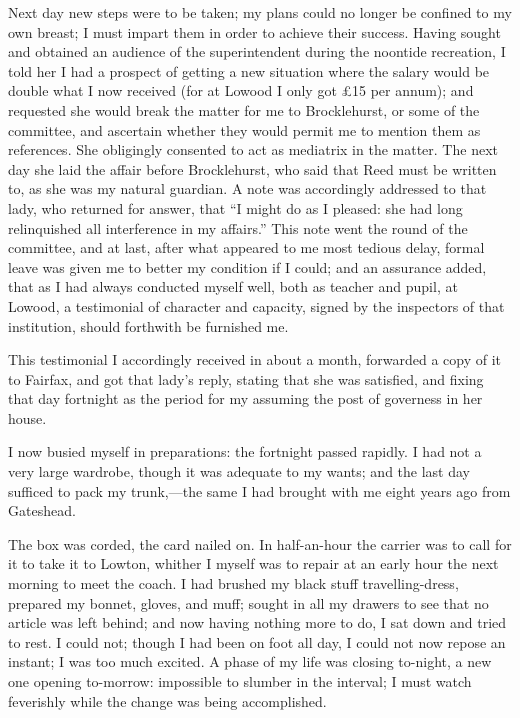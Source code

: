 Next day new steps were to be taken; my plans could no longer be
confined to my own breast; I must impart them in order to achieve their
success. Having sought and obtained an audience of the superintendent
during the noontide recreation, I told her I had a prospect of getting a
new situation where the salary would be double what I now received (for
at Lowood I only got £15 per annum); and requested she would break the
matter for me to \Mr{} Brocklehurst, or some of the committee, and
ascertain whether they would permit me to mention them as references.
She obligingly consented to act as mediatrix in the matter. The next
day she laid the affair before \Mr{} Brocklehurst, who said that \Mrs{} Reed
must be written to, as she was my natural guardian. A note was
accordingly addressed to that lady, who returned for answer, that
\enquote{I might do as I pleased: she had long relinquished all
	interference in my affairs.} This note went the round of the committee,
and at last, after what appeared to me most tedious delay, formal leave
was given me to better my condition if I could; and an assurance added,
that as I had always conducted myself well, both as teacher and pupil,
at Lowood, a testimonial of character and capacity, signed by the
inspectors of that institution, should forthwith be furnished me.

This testimonial I accordingly received in about a month, forwarded a
copy of it to \Mrs{} Fairfax, and got that lady's reply, stating that she
was satisfied, and fixing that day fortnight as the period for my
assuming the post of governess in her house.

I now busied myself in preparations: the fortnight passed rapidly. I
had not a very large wardrobe, though it was adequate to my wants; and
the last day sufficed to pack my trunk,---the same I had brought with me
eight years ago from Gateshead.

The box was corded, the card nailed on. In half-an-hour the carrier was
to call for it to take it to Lowton, whither I myself was to repair at
an early hour the next morning to meet the coach. I had brushed my
black stuff travelling-dress, prepared my bonnet, gloves, and muff;
sought in all my drawers to see that no article was left behind; and now
having nothing more to do, I sat down and tried to rest. I could not;
though I had been on foot all day, I could not now repose an instant; I
was too much excited. A phase of my life was closing to-night, a new
one opening to-morrow: impossible to slumber in the interval; I must
watch feverishly while the change was being accomplished.

